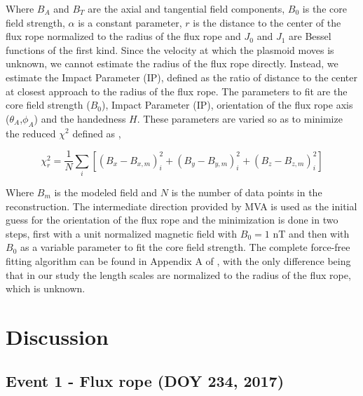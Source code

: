 Where $B_A$ and $B_T$ are the axial and tangential field components, $B_0$ is the core field strength, $\alpha$ is a constant parameter, $r$ is the distance to the center of the flux rope normalized to the radius of the flux rope and $J_0$ and $J_1$ are Bessel functions of the first kind. Since the velocity at which the plasmoid moves is unknown, we cannot estimate the radius of the flux rope directly. Instead, we estimate the Impact Parameter (IP), defined as the ratio of distance to the center at closest approach to the radius of the flux rope. The parameters to fit are the core field strength ($B_0$), Impact Parameter (IP), orientation of the flux rope axis ($\theta_A$,$\phi_A$) and the handedness $H$. These parameters are varied so as to minimize the reduced $\chi^2$ defined as \cite{Lepping1990MagneticAU},

\begin{equation}
    \chi^2_r = \frac{1}{N} \sum_i \left[ \left( B_x - B_{x,m}\right)^2_i + \left( B_y - B_{y,m}\right)^2_i + \left( B_z - B_{z,m}\right)^2_i \right] 
\end{equation}

Where $B_m$ is the modeled field and $N$ is the number of data points in the reconstruction. The intermediate direction provided by MVA is used as the initial guess for the orientation of the flux rope and the minimization is done in two steps, first with a unit normalized magnetic field with $B_0=1$ nT and then with $B_0$ as a variable parameter to fit the core field strength. The complete force-free fitting algorithm can be found in Appendix A of \cite{Akhavan-Tafti2018MMSMagnetopause}, with the only difference being that in our study the length scales are normalized to the radius of the flux rope, which is unknown.

\section{Discussion}
\subsection{Event 1 - Flux rope (DOY 234, 2017)}

